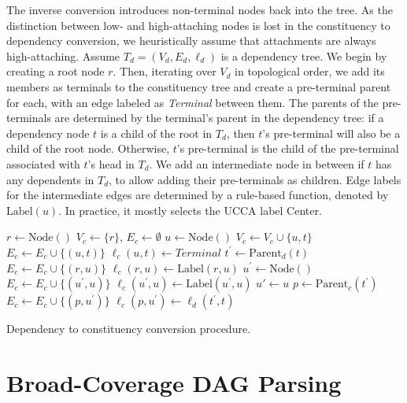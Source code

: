 \documentclass[11pt]{article}
\begin{document}
The inverse conversion introduces non-terminal nodes back into the tree.
As the distinction between low- and high-attaching nodes is lost in the constituency to
dependency conversion, we heuristically assume that attachments are always
high-attaching.
Assume $T_d=(V_d,E_d,\ell_d)$ is a dependency tree.
We begin by creating a root node $r$.
Then, iterating over $V_d$ in topological order,
we add its members as terminals to the constituency tree
and create a pre-terminal parent for each,
with an edge labeled as \textit{Terminal} between them.
The parents of the pre-terminals are determined by the terminal's parent in the dependency
tree: if a dependency node $t$ is a child of the root in $T_d$, then $t$'s pre-terminal will also be a child of the root node. Otherwise, $t$'s pre-terminal is the child of the pre-terminal associated with $t$'s head in $T_d$. We add an intermediate node in between if $t$ has any dependents in $T_d$,
to allow adding their pre-terminals as children.
Edge labels for the intermediate edges are determined by a rule-based function, denoted by $\mathrm{Label}(u)$.
In practice, it mostly selects the UCCA label Center.

\begin{algorithm}
  \small
 $r \leftarrow \mathrm{Node()}$\;
 $V_c \leftarrow \{r\}$,
 $E_c \leftarrow \emptyset$\;
  {
  $u \leftarrow \mathrm{Node()}$\;
  $V_c \leftarrow V_c \cup \{u, t\}$\;
  $E_c \leftarrow E_c \cup \{(u, t)\}$\;
  $\ell_c(u,t)\leftarrow\mathit{Terminal}$\;
  $t^\prime \leftarrow \mathrm{Parent}_d(t)$\;
   {
   $E_c \leftarrow E_c \cup \{(r, u)\}$\;
   $\ell_c(r, u) \leftarrow \mathrm{Label}(r,u)$\;
  } {
    {
    $u^\prime \leftarrow \mathrm{Node()}$\;
    $E_c \leftarrow E_c \cup \{(u^\prime, u)\}$\;
    $\ell_c(u^\prime, u) \leftarrow \mathrm{Label}(u^\prime, u)$\;
   } {
    $u' \leftarrow u$\;
   }
   $p \leftarrow \mathrm{Parent}_c(t^\prime)$\;
   $E_c \leftarrow E_c \cup \{(p, u^\prime)\}$\;
   $\ell_c(p, u^\prime) \leftarrow \ell_d(t^\prime, t)$\;
  }
 }
 \caption{\small Dependency to constituency conversion procedure.}
 \label{alg:dep2con}
\end{algorithm}


\section{Broad-Coverage DAG Parsing}\label{sec:direct_approach}
\end{document}
